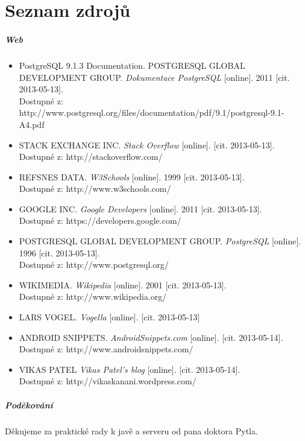 \chapter{Seznam zdrojů}
\paragraph{Web}
\begin{itemize}
\item PostgreSQL 9.1.3 Documentation. POSTGRESQL GLOBAL DEVELOPMENT GROUP. \textit{Dokumentace PostgreSQL} [online]. 2011 [cit. 2013-05-13]. \\Dostupné z: http://www.postgresql.org/files/documentation/pdf/9.1/postgresql-9.1-A4.pdf
\item STACK EXCHANGE INC. \textit{Stack Overflow} [online]. [cit. 2013-05-13].\\Dostupné z: http://stackoverflow.com/
\item REFSNES DATA. \textit{W3Schools} [online]. 1999 [cit. 2013-05-13].\\Dostupné z: http://www.w3schools.com/
\item GOOGLE INC. \textit{Google Developers} [online]. 2011 [cit. 2013-05-13].\\Dostupné z: https://developers.google.com/
\item POSTGRESQL GLOBAL DEVELOPMENT GROUP. \textit{PostgreSQL} [online]. 1996 [cit. 2013-05-13].\\Dostupné z: http://www.postgresql.org/
\item WIKIMEDIA. \textit{Wikipedia} [online]. 2001 [cit. 2013-05-13].\\Dostupné z: http://www.wikipedia.org/
\item LARS VOGEL. \textit{Vogella} [online]. [cit. 2013-05-13]
\item ANDROID SNIPPETS. \textit{AndroidSnippets.com} [online]. [cit. 2013-05-14].\\Dostupné z: http://www.androidsnippets.com/ 
\item VIKAS PATEL \textit{Vikas Patel's blog} [online]. [cit. 2013-05-14].\\Dostupné z: http://vikaskanani.wordpress.com/
\end{itemize}
\paragraph{Poděkování}
\paragraph{}
Děkujeme za praktické rady k javě a serveru od pana doktora Pytla. 
